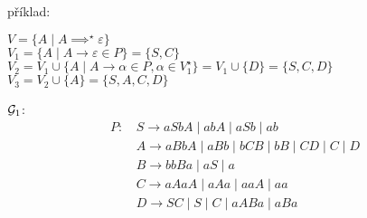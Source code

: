 \begin{multicols}{2}
    příklad:

    $V = \{A \mid A \implies^{\star} \varepsilon \}$\\
    $V_1 = \{A \mid A \rightarrow \varepsilon \in P\} = \{S, C\}$\\
    $V_2 = V_1 \cup \{A \mid A \rightarrow \alpha \in P, \alpha \in V_1^{\star}\} = V_1 \cup \{D\} = \{S, C, D\}$\\
    $V_3 = V_2 \cup \{A\} = \{S, A, C, D\}$

\columnbreak

    $\mathcal{G}_1$:
        \begin{align*}
            P\text{: } & S \rightarrow aSbA \mid abA \mid aSb \mid ab  \\
            & A \rightarrow aBbA \mid aBb \mid bCB \mid bB \mid CD \mid C \mid D \\
            & B \rightarrow bbBa \mid aS \mid a\\
            & C \rightarrow aAaA \mid aAa \mid aaA \mid aa \\
            & D \rightarrow SC \mid S \mid C \mid aABa \mid aBa \\
        \end{align*}

\end{multicols}

